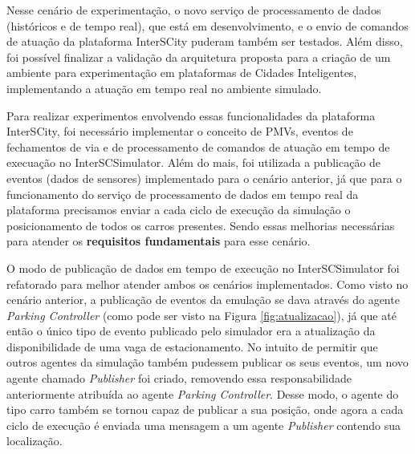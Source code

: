 Nesse cenário de experimentação, o novo serviço de processamento de dados (históricos e de tempo real), que está em desenvolvimento, e o envio de comandos de atuação da plataforma
InterSCity puderam também ser testados.
Além disso, foi possível finalizar a validação da arquitetura proposta para a criação de um ambiente para experimentação em plataformas de Cidades Inteligentes,
implementando a atuação em tempo real no ambiente simulado.

Para realizar experimentos envolvendo essas funcionalidades da plataforma InterSCity, foi necessário implementar o conceito de PMVs, eventos de fechamentos de via e de
processamento de comandos de atuação em tempo de execuação no InterSCSimulator.
Além do mais, foi utilizada a publicação de eventos (dados de sensores) implementado para o cenário anterior, já que para o funcionamento do serviço de processamento de dados
em tempo real da plataforma precisamos enviar a cada ciclo de execução da simulação o posicionamento de todos os carros presentes.
Sendo essas melhorias necessárias para atender os \textbf{requisitos fundamentais} para esse cenário.

O modo de publicação de dados em tempo de execução no InterSCSimulator foi refatorado para melhor atender ambos os cenários implementados.
Como visto no cenário anterior, a publicação de eventos da emulação se dava através do agente \textit{Parking Controller} (como pode ser visto na Figura \ref{fig:atualizacao}), já que
até então o único tipo de evento publicado pelo simulador era a atualização da disponibilidade de uma vaga de estacionamento.
No intuito de permitir que outros agentes da simulação também pudessem publicar os seus eventos, um novo agente chamado \textit{Publisher} foi criado, removendo essa responsabilidade
anteriormente atribuída ao agente \textit{Parking Controller}.
Desse modo, o agente do tipo carro também se tornou capaz de publicar a sua posição, onde agora a cada ciclo de execução é enviada uma mensagem a um agente \textit{Publisher}
contendo sua localização.


